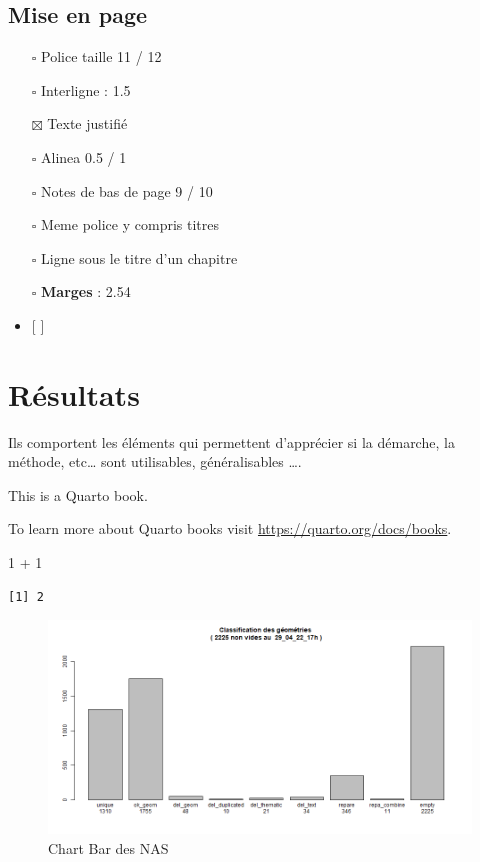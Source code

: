 \documentclass[
  a4paper,
]{scrbook}
\newenvironment{Shaded}{}{}
\newcommand{\DecValTok}[1]{\textcolor[rgb]{0.00,0.36,0.77}{#1}}
\newcommand{\SpecialCharTok}[1]{\textcolor[rgb]{0.00,0.36,0.77}{#1}}
\begin{document}
\hypertarget{mise-en-page}{%
\section{Mise en page}\label{mise-en-page}}

\begin{itemize}
\item[$\square$]
  Police taille 11 / 12
\item[$\square$]
  Interligne : 1.5
\item[$\boxtimes$]
  Texte justifié
\item[$\square$]
  Alinea 0.5 / 1
\item[$\square$]
  Notes de bas de page 9 / 10
\item[$\square$]
  Meme police y compris titres
\item[$\square$]
  Ligne sous le titre d'un chapitre
\item[$\square$]
  \textbf{Marges} : 2.54
\item
  {[} {]}
\end{itemize}


\hypertarget{ruxe9sultats}{%
\chapter{Résultats}\label{ruxe9sultats}}

Ils comportent les éléments qui permettent d'apprécier si la démarche,
la méthode, etc\ldots{} sont utilisables, généralisables \ldots.

This is a Quarto book.

To learn more about Quarto books visit
\url{https://quarto.org/docs/books}.

\begin{Shaded}
\begin{Highlighting}[numbers=left,,]
\DecValTok{1} \SpecialCharTok{+} \DecValTok{1}
\end{Highlighting}
\end{Shaded}

\begin{verbatim}
[1] 2
\end{verbatim}

\begin{figure}

{\centering \includegraphics{./figures/bar_classify_Del_29_04_22_17h.png}

}

\caption{Chart Bar des NAS}

\end{figure}
\end{document}
